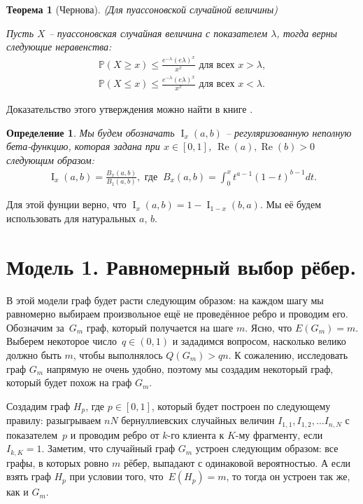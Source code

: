 \documentclass{matmex-diploma-custom}
\newcommand{\PRob}{\mathbb P}
\newcommand{\leqs}{\leqslant}
\newcommand{\geqs}{\geqslant}
\DeclareMathOperator{\re}{Re}
\DeclareMathOperator{\I}{I}
\newtheorem{define}{Определение}
\theoremstyle{named}
\newtheorem*{namedtheorem}{Теорема}
\begin{document}
\begin{namedtheorem}[Чернова] (Для пуассоновской случайной величины)

Пусть $X$ -- пуассоновская случайная величина с показателем $\lambda$, тогда верны следующие неравенства:
\begin{align} \label{gr_1}
\PRob(X \geqs x) \leqs \frac{e^{-\lambda}(e\lambda)^x}{x^x} \text{ для всех } x > \lambda,
\\
\label{gr_2}
\PRob(X \leqs x) \leqs \frac{e^{-\lambda}(e\lambda)^x}{x^x} \text{ для всех } x < \lambda.
\end{align}
\end{namedtheorem}
Доказательство этого утверждения можно найти в книге \cite{chernov_gr}.

\medskip

\begin{define}
Мы будем обозначать $\I_x(a,b)$ -- регуляризованную неполную бета-функцию, 
которая задана при $x \in [0,1]$, $\re(a), \re(b) > 0$ следующим образом:
\begin{equation} \label{i_x} \begin{aligned}
\I_x(a,b) = \frac{B_x(a,b)}{B_1(a,b)}, \text{ где }~ 
B_x(a,b) = \int_0^x t^{a-1} (1-t)^{b-1} dt.
\end{aligned}\end{equation}
\end{define}
Для этой фунции верно, что $\I_x(a,b) = 1 - \I_{1-x}(b, a)$.
Мы её будем использовать для натуральных $a$, $b$.


\newpage
\section*{Модель 1. Равномерный выбор рёбер.}
В этой модели граф будет расти следующим образом: на каждом шагу мы равномерно выбираем произвольное ещё не проведённое ребро 
и проводим его. Обозначим за~$G_m$ граф, который получается на шаге $m$. Ясно, что $E(G_m) = m$.
Выберем некоторое число~$q \in (0, 1)$ и зададимся вопросом, насколько велико должно быть $m$, чтобы выполнялось $Q(G_m) > qn$.
К сожалению, исследовать граф $G_m$ напрямую не очень удобно, поэтому мы создадим некоторый граф, который будет похож на граф $G_m$.

Создадим граф $H_p$, где $p \in [0, 1]$, который будет построен по следующему правилу: 
разыгрываем $nN$ бернуллиевских случайных величин $I_{1,1}, I_{1,2}, \dots I_{n,N}$ с показателем~$p$ 
и проводим ребро от $k$-го клиента к $K$-му фрагменту, если $I_{k, K} = 1$.
Заметим, что случайный граф $G_m$ устроен следующим образом: все графы, в которых ровно $m$ рёбер, выпадают с одинаковой вероятностью.
А если взять граф $H_p$ при условии того, что~$E(H_p) = m$, то тогда он устроен так же, как и $G_m$.
\end{document}
